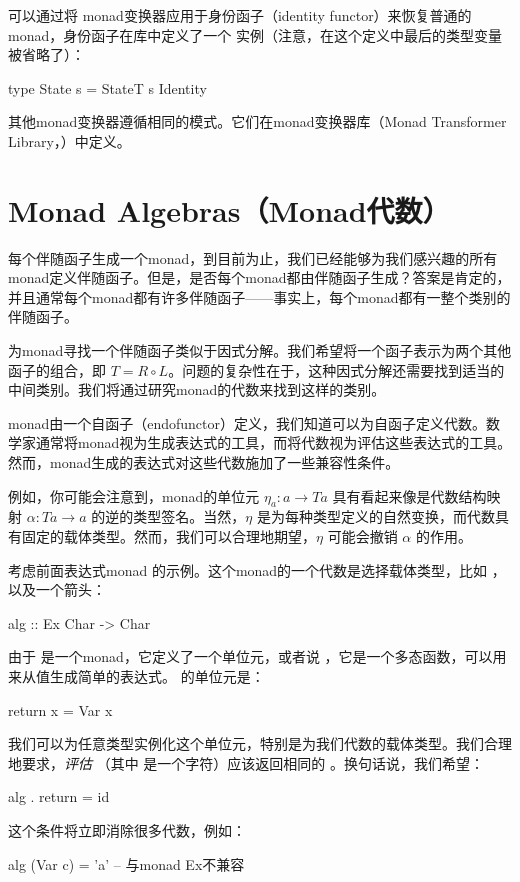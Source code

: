 \documentclass[DaoFP]{subfiles}
\begin{document}
    可以通过将  monad变换器应用于身份函子（identity functor）来恢复普通的  monad，身份函子在库中定义了一个  实例（注意，在这个定义中最后的类型变量  被省略了）：
    \begin{haskell}
        type State s = StateT s Identity
    \end{haskell}

    其他monad变换器遵循相同的模式。它们在monad变换器库（Monad Transformer Library，）中定义。

    \section{Monad Algebras（Monad代数）}

    每个伴随函子生成一个monad，到目前为止，我们已经能够为我们感兴趣的所有monad定义伴随函子。但是，是否每个monad都由伴随函子生成？答案是肯定的，并且通常每个monad都有许多伴随函子——事实上，每个monad都有一整个类别的伴随函子。

    为monad寻找一个伴随函子类似于因式分解。我们希望将一个函子表示为两个其他函子的组合，即 $T = R \circ L$。问题的复杂性在于，这种因式分解还需要找到适当的中间类别。我们将通过研究monad的代数来找到这样的类别。

    monad由一个自函子（endofunctor）定义，我们知道可以为自函子定义代数。数学家通常将monad视为生成表达式的工具，而将代数视为评估这些表达式的工具。然而，monad生成的表达式对这些代数施加了一些兼容性条件。

    例如，你可能会注意到，monad的单位元 $\eta_a \colon a \to T a$ 具有看起来像是代数结构映射 $\alpha \colon T a \to a$ 的逆的类型签名。当然，$\eta$ 是为每种类型定义的自然变换，而代数具有固定的载体类型。然而，我们可以合理地期望，$\eta$ 可能会撤销 $\alpha$ 的作用。

    考虑前面表达式monad  的示例。这个monad的一个代数是选择载体类型，比如 ，以及一个箭头：
    \begin{haskell}
        alg :: Ex Char -> Char
    \end{haskell}
    由于  是一个monad，它定义了一个单位元，或者说 ，它是一个多态函数，可以用来从值生成简单的表达式。  的单位元是：
    \begin{haskell}
        return x = Var x
    \end{haskell}
    我们可以为任意类型实例化这个单位元，特别是为我们代数的载体类型。我们合理地要求，\emph{评估} （其中  是一个字符）应该返回相同的 。换句话说，我们希望：
    \begin{haskell}
        alg . return = id
    \end{haskell}
    这个条件将立即消除很多代数，例如：
    \begin{haskell}
        alg (Var c) = 'a' -- 与monad Ex不兼容
    \end{haskell}
\end{document}
